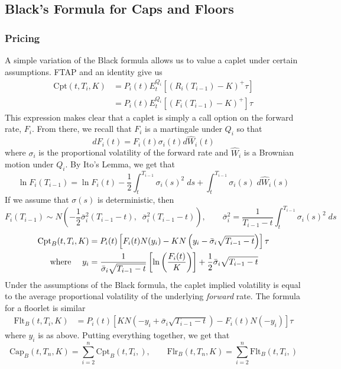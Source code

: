 \documentclass[a4paper,12pt]{scrartcl}
\begin{document}
\newpage

\subsection{Black's Formula for Caps and Floors}

\subsubsection{Pricing}
A simple variation of the Black formula allows us to value a caplet
under certain assumptions. FTAP and an identity give us
\begin{align*}
   \text{Cpt}(t,T_i,K) &= P_i(t) E^{Q_i}_t\left[(R_i(T_{i-1})-K)^+ \tau
      \right]\\
      &= P_i(t) E^{Q_i}_t\left[(F_i(T_{i-1})-K)^+\right]\tau
\end{align*}
This expression makes clear that a caplet is simply a call option on 
the forward rate, $F_i$. From there, we recall that $F_i$ is a 
martingale under $Q_i$ so that 
   \[ dF_i(t) = F_i(t) \sigma_i(t) d\hat{W}_i(t) \]
where $\sigma_i$ is the proportional volatility of the forward rate
and $\hat{W}_i$ is a Brownian motion under $Q_i$. By Ito's Lemma,
we get that 
\[ \ln F_i(T_{i-1}) = \ln F_i(t) - \frac{1}{2} \int^{T_{i-1}}_t 
   \sigma_i(s)^2 \; ds + \int^{T_{i-1}}_t  \sigma_i(s) \; d\hat{W}_i(s)
   \]
If we assume that $\sigma(s)$ is deterministic, then 
\[ F_i(T_{i-1}) \sim N\left(-\frac{1}{2}\bar{\sigma}^2_i(T_{i-1} - t),
   \;\;\bar{\sigma}^2_i(T_{i-1}-t) \right), \qquad \bar{\sigma}^2_i = 
   \frac{1}{T_{i-1} - t} \int^{T_{i-1}}_t \sigma_i(s)^2 \; ds \]
\begin{align}
   \label{capletblack}
   \text{Cpt}_B(t,T_i,K) &= P_i(t) \left[ F_i(t) N(y_i) - K N\left(y_i - 
   \bar{\sigma}_i \sqrt{T_{i-1} - t}\right) \right] \tau \notag\\
   \text{where }\quad y_i &= \frac{1}{\bar{\sigma}_i \sqrt{T_{i-1} - t}}
   \left[ \ln \left(\frac{F_i(t)}{K}\right)\right] + \frac{1}{2}
   \bar{\sigma}_i\sqrt{T_{i-1} - t} 
\end{align}
Under the assumptions of the Black formula, the caplet implied 
volatility is equal to the average proportional volatility of the
underlying \emph{forward} rate. The formula for a floorlet is
similar
\begin{align}
   \label{floorletblack}
   \text{Flt}_B(t,T_i,K) &= P_i(t) \left[ K N\left(-y_i + 
   \bar{\sigma}_i \sqrt{T_{i-1}-t}\right)-F_i(t) N(-y_i)\right] \tau 
\end{align}
where $y_i$ is as above. Putting everything together, we get that 
\begin{equation}
   \label{capfloorblack}
   \text{Cap}_B(t,T_n,K) = \sum^n_{i=2} \text{Cpt}_B(t,T_i,), \qquad
   \text{Flr}_B(t,T_n,K) = \sum^n_{i=2} \text{Flt}_B(t,T_i,)
\end{equation}
\end{document}

